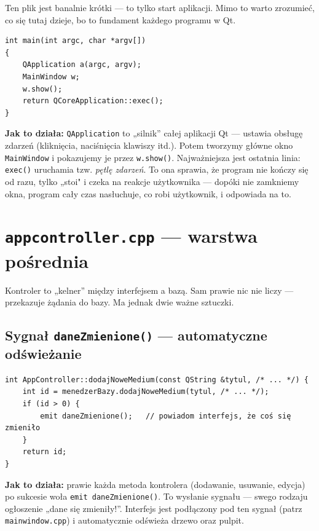 \documentclass[11pt,a4paper]{article}
\begin{document}
Ten plik jest banalnie krótki --- to tylko start aplikacji. Mimo to warto
zrozumieć, co się tutaj dzieje, bo to fundament każdego programu w Qt.

\begin{lstlisting}[caption={Uruchomienie aplikacji}]
int main(int argc, char *argv[])
{
    QApplication a(argc, argv);
    MainWindow w;
    w.show();
    return QCoreApplication::exec();
}
\end{lstlisting}

\textbf{Jak to działa:} \texttt{QApplication} to „silnik” całej aplikacji Qt ---
ustawia obsługę zdarzeń (kliknięcia, naciśnięcia klawiszy itd.). Potem tworzymy
główne okno \texttt{MainWindow} i pokazujemy je przez \texttt{w.show()}.
Najważniejsza jest ostatnia linia: \texttt{exec()} uruchamia tzw. \emph{pętlę
zdarzeń}. To ona sprawia, że program nie kończy się od razu, tylko „stoi" i czeka
na reakcje użytkownika --- dopóki nie zamkniemy okna, program cały czas nasłuchuje,
co robi użytkownik, i odpowiada na to.

\section{\texttt{appcontroller.cpp} --- warstwa pośrednia}

Kontroler to „kelner” między interfejsem a bazą. Sam prawie nic nie liczy ---
przekazuje żądania do bazy. Ma jednak dwie ważne sztuczki.

\subsection{Sygnał \texttt{daneZmienione()} --- automatyczne odświeżanie}

\begin{lstlisting}[caption={Po udanej zmianie w bazie wysyłamy sygnał}]
int AppController::dodajNoweMedium(const QString &tytul, /* ... */) {
    int id = menedzerBazy.dodajNoweMedium(tytul, /* ... */);
    if (id > 0) {
        emit daneZmienione();   // powiadom interfejs, że coś się zmieniło
    }
    return id;
}
\end{lstlisting}

\textbf{Jak to działa:} prawie każda metoda kontrolera (dodawanie, usuwanie,
edycja) po sukcesie woła \texttt{emit daneZmienione()}. To wysłanie sygnału ---
swego rodzaju ogłoszenie „dane się zmieniły!”. Interfejs jest podłączony pod ten
sygnał (patrz \texttt{mainwindow.cpp}) i automatycznie odświeża drzewo oraz pulpit.
\end{document}
